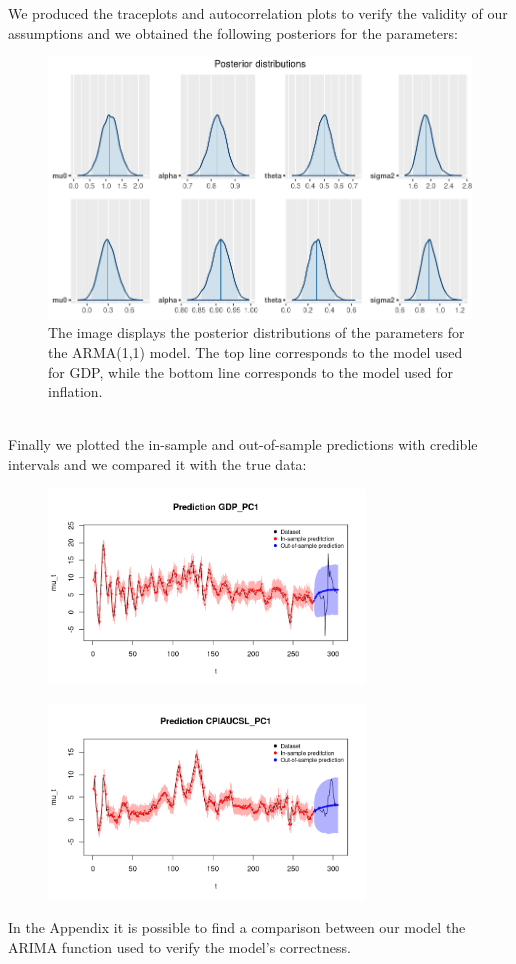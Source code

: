 We produced the traceplots and autocorrelation plots to verify the validity of our assumptions and we obtained the following posteriors for the parameters: \\
\begin{figure}[h]
    \centering
    \includegraphics[width=\textwidth]{images/4-ARMA/posteriors.png}
    \caption{The image displays the posterior distributions of the parameters for the ARMA(1,1) model. The top line corresponds to the model used for GDP, while the bottom line corresponds to the model used for inflation.}
    \label{fig:ARMA_posteriors}
\end{figure} \\
Finally we plotted the in-sample and out-of-sample predictions with credible intervals and we compared it with the true data: \\   
\begin{figure}[h]
    \centering
    \includegraphics[width=0.75\textwidth]{images/4-ARMA/gdp_prediction.png}
    \label{fig:ARMA_first}
\end{figure} 
\begin{figure}[h]
    \centering
    \includegraphics[width=0.75\textwidth]{images/4-ARMA/infl_prediction.png}
    \label{fig:ARMA_second}
\end{figure} 
In the Appendix it is possible to find a comparison between our model the ARIMA function used to verify the model's correctness.